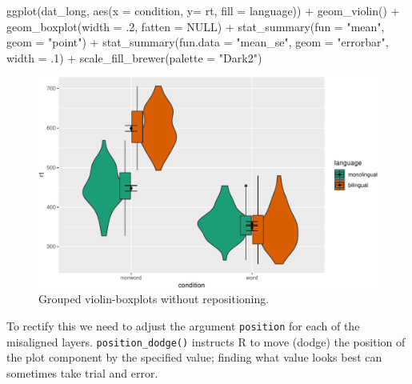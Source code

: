 \documentclass[
  english,
  doc,floatsintext]{apa6}
\newenvironment{Shaded}{\begin{snugshade}}{\end{snugshade}}
\newcommand{\AttributeTok}[1]{\textcolor[rgb]{0.77,0.63,0.00}{#1}}
\newcommand{\ConstantTok}[1]{\textcolor[rgb]{0.00,0.00,0.00}{#1}}
\newcommand{\DecValTok}[1]{\textcolor[rgb]{0.00,0.00,0.81}{#1}}
\newcommand{\FunctionTok}[1]{\textcolor[rgb]{0.00,0.00,0.00}{#1}}
\newcommand{\NormalTok}[1]{#1}
\newcommand{\SpecialCharTok}[1]{\textcolor[rgb]{0.00,0.00,0.00}{#1}}
\newcommand{\StringTok}[1]{\textcolor[rgb]{0.31,0.60,0.02}{#1}}
\begin{document}
\begin{Shaded}
\begin{Highlighting}[]
\FunctionTok{ggplot}\NormalTok{(dat\_long, }\FunctionTok{aes}\NormalTok{(}\AttributeTok{x =}\NormalTok{ condition, }\AttributeTok{y=}\NormalTok{ rt, }\AttributeTok{fill =}\NormalTok{ language)) }\SpecialCharTok{+}
  \FunctionTok{geom\_violin}\NormalTok{() }\SpecialCharTok{+}
  \FunctionTok{geom\_boxplot}\NormalTok{(}\AttributeTok{width =}\NormalTok{ .}\DecValTok{2}\NormalTok{, }
               \AttributeTok{fatten =} \ConstantTok{NULL}\NormalTok{) }\SpecialCharTok{+}
  \FunctionTok{stat\_summary}\NormalTok{(}\AttributeTok{fun =} \StringTok{"mean"}\NormalTok{,  }\AttributeTok{geom =} \StringTok{"point"}\NormalTok{) }\SpecialCharTok{+}
  \FunctionTok{stat\_summary}\NormalTok{(}\AttributeTok{fun.data =} \StringTok{"mean\_se"}\NormalTok{, }
               \AttributeTok{geom =} \StringTok{"errorbar"}\NormalTok{, }
               \AttributeTok{width =}\NormalTok{ .}\DecValTok{1}\NormalTok{) }\SpecialCharTok{+}
  \FunctionTok{scale\_fill\_brewer}\NormalTok{(}\AttributeTok{palette =} \StringTok{"Dark2"}\NormalTok{)}
\end{Highlighting}
\end{Shaded}

\begin{figure}

{\centering \includegraphics[width=1\linewidth]{images/viobox2-1} 

}

\caption{Grouped violin-boxplots without repositioning.}\label{fig:viobox2}
\end{figure}

To rectify this we need to adjust the argument \texttt{position} for each of the misaligned layers. \texttt{position\_dodge()} instructs R to move (dodge) the position of the plot component by the specified value; finding what value looks best can sometimes take trial and error.
\end{document}
